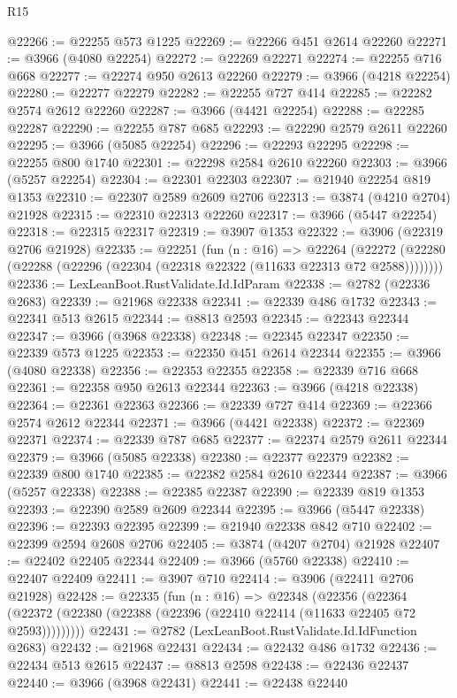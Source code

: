 \begin{lexlean}{R15}
\begin{coremodule}
@22266 := @22255 @573 @1225
@22269 := @22266 @451 @2614 @22260
@22271 := @3966 (@4080 @22254)
@22272 := @22269 @22271
@22274 := @22255 @716 @668
@22277 := @22274 @950 @2613 @22260
@22279 := @3966 (@4218 @22254)
@22280 := @22277 @22279
@22282 := @22255 @727 @414
@22285 := @22282 @2574 @2612 @22260
@22287 := @3966 (@4421 @22254)
@22288 := @22285 @22287
@22290 := @22255 @787 @685
@22293 := @22290 @2579 @2611 @22260
@22295 := @3966 (@5085 @22254)
@22296 := @22293 @22295
@22298 := @22255 @800 @1740
@22301 := @22298 @2584 @2610 @22260
@22303 := @3966 (@5257 @22254)
@22304 := @22301 @22303
@22307 := @21940 @22254 @819 @1353
@22310 := @22307 @2589 @2609 @2706
@22313 := @3874 (@4210 @2704) @21928
@22315 := @22310 @22313 @22260
@22317 := @3966 (@5447 @22254)
@22318 := @22315 @22317
@22319 := @3907 @1353
@22322 := @3906 (@22319 @2706 @21928)
@22335 := @22251
    (fun (n : @16) =>
    @22264 (@22272 (@22280 (@22288 (@22296 (@22304 (@22318 @22322 (@11633 @22313 @72 @2588))))))))
@22336 := LexLeanBoot.RustValidate.Id.IdParam
@22338 := @2782 (@22336 @2683)
@22339 := @21968 @22338
@22341 := @22339 @486 @1732
@22343 := @22341 @513 @2615
@22344 := @8813 @2593
@22345 := @22343 @22344
@22347 := @3966 (@3968 @22338)
@22348 := @22345 @22347
@22350 := @22339 @573 @1225
@22353 := @22350 @451 @2614 @22344
@22355 := @3966 (@4080 @22338)
@22356 := @22353 @22355
@22358 := @22339 @716 @668
@22361 := @22358 @950 @2613 @22344
@22363 := @3966 (@4218 @22338)
@22364 := @22361 @22363
@22366 := @22339 @727 @414
@22369 := @22366 @2574 @2612 @22344
@22371 := @3966 (@4421 @22338)
@22372 := @22369 @22371
@22374 := @22339 @787 @685
@22377 := @22374 @2579 @2611 @22344
@22379 := @3966 (@5085 @22338)
@22380 := @22377 @22379
@22382 := @22339 @800 @1740
@22385 := @22382 @2584 @2610 @22344
@22387 := @3966 (@5257 @22338)
@22388 := @22385 @22387
@22390 := @22339 @819 @1353
@22393 := @22390 @2589 @2609 @22344
@22395 := @3966 (@5447 @22338)
@22396 := @22393 @22395
@22399 := @21940 @22338 @842 @710
@22402 := @22399 @2594 @2608 @2706
@22405 := @3874 (@4207 @2704) @21928
@22407 := @22402 @22405 @22344
@22409 := @3966 (@5760 @22338)
@22410 := @22407 @22409
@22411 := @3907 @710
@22414 := @3906 (@22411 @2706 @21928)
@22428 := @22335
    (fun (n : @16) =>
    @22348
      (@22356
        (@22364 (@22372 (@22380 (@22388 (@22396 (@22410 @22414 (@11633 @22405 @72 @2593)))))))))
@22431 := @2782 (LexLeanBoot.RustValidate.Id.IdFunction @2683)
@22432 := @21968 @22431
@22434 := @22432 @486 @1732
@22436 := @22434 @513 @2615
@22437 := @8813 @2598
@22438 := @22436 @22437
@22440 := @3966 (@3968 @22431)
@22441 := @22438 @22440

\end{coremodule}
\end{lexlean}
